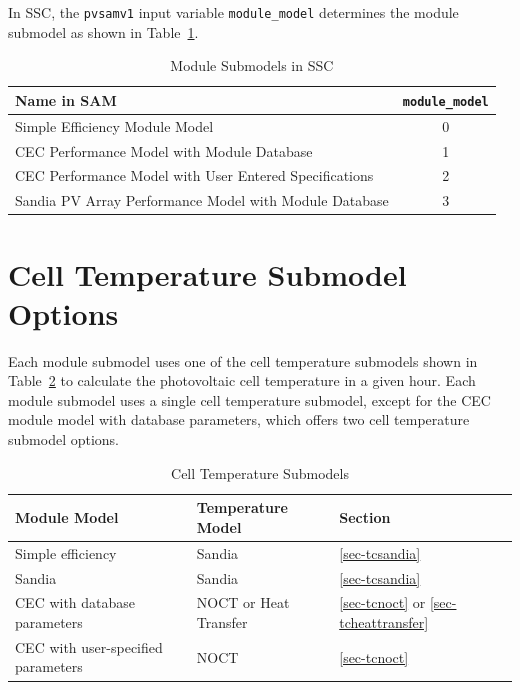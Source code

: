 \documentclass[12pt,letterpaper]{article}
\begin{document}
In SSC, the \texttt{pvsamv1} input variable \texttt{module\_model} determines the module submodel as shown in Table~\ref{tab-modulesubmodels}.

\begin{table}
\begin{center}
\caption{Module Submodels in SSC}
\begin{tabular}{lc}
\midrule
Name in SAM & \texttt{module\_model} \\
\midrule
Simple Efficiency Module Model & 0 \\
CEC Performance Model with Module Database & 1 \\
CEC Performance Model with User Entered Specifications & 2 \\
Sandia PV Array Performance Model with Module Database & 3 \\
\hline
\end{tabular}
\label{tab-modulesubmodels}
\end{center}
\end{table}

\section{Cell Temperature Submodel Options}\label{sec-celltempoptions}

Each module submodel uses one of the cell temperature submodels shown in Table~\ref{tab-tempcorr} to calculate the photovoltaic cell temperature in a given hour. Each module submodel uses a single cell temperature submodel, except for the CEC module model with database parameters, which offers two cell temperature submodel options.

\begin{table}
\begin{center}
\caption{Cell Temperature Submodels}
\begin{tabular}{lll}
\midrule
Module Model & Temperature Model & Section\\
\midrule
Simple efficiency & Sandia & \ref{sec-tcsandia}\\
Sandia & Sandia & \ref{sec-tcsandia} \\
CEC with database parameters & NOCT or Heat Transfer & \ref{sec-tcnoct} or \ref{sec-tcheattransfer}\\
CEC with user-specified parameters & NOCT & \ref{sec-tcnoct}\\
\hline
\end{tabular}
\label{tab-tempcorr}
\end{center}
\end{table}
\end{document}
